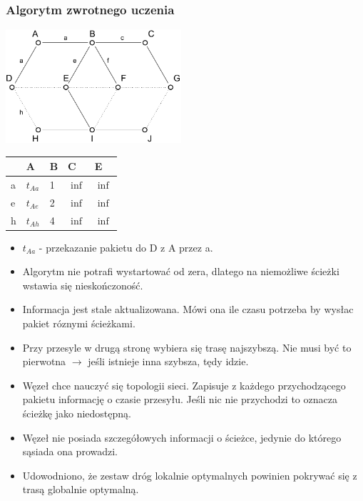 \documentclass[a4paper,twoside]{article}
\begin{document}
			\subsubsection{Algorytm zwrotnego uczenia}
				\includegraphics[width=6.5cm]{./images/image37.pdf}
				\begin{tabular}{l|l|l|l|l}
         & A          & B & C        & E                             \\ \hline
					a            & $ t_{Aa} $ & 1 & $ \inf $ & \multicolumn{1}{l|}{$ \inf $} \\ \hline
					e            & $ t_{Ae} $ & 2 & $ \inf $ & \multicolumn{1}{l|}{$ \inf $} \\ \hline
					h            & $ t_{Ah} $ & 4 & $ \inf $ & \multicolumn{1}{l|}{$ \inf $} \\ \cline{2-5} 
				\end{tabular}
				\begin{itemize}
					\item $ t_{Aa} $ - przekazanie pakietu do D z A przez a.
					\item Algorytm nie potrafi wystartować od zera, dlatego na niemożliwe ścieżki wstawia się nieskończoność.
					\item Informacja jest stale aktualizowana. Mówi ona ile czasu potrzeba by wysłac pakiet róznymi ścieżkami.
					\item Przy przesyle w drugą stronę wybiera się trasę najszybszą. Nie musi być to pierwotna $ \rightarrow $ jeśli istnieje inna szybsza, tędy idzie.
					\item Węzeł chce nauczyć się topologii sieci. Zapisuje z każdego przychodzącego pakietu informację o czasie przesyłu. Jeśli nic nie przychodzi to oznacza ścieżkę jako niedostępną.
					\item Węzeł nie posiada szczegółowych informacji o ścieżce, jedynie do którego sąsiada ona prowadzi.
					\item Udowodniono, że zestaw dróg lokalnie optymalnych powinien pokrywać się z trasą globalnie optymalną.
				\end{itemize}
\end{document}
